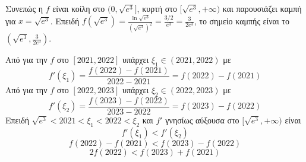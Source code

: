 \begin{alist}
    Συνεπώς η $f$ είναι κοίλη στο $(0, \sqrt{e^3}]$, κυρτή στο $[\sqrt{e^3}, +\infty)$ και παρουσιάζει καμπή για $x = \sqrt{e^3}$. Επειδή $f(\sqrt{e^3}) = \frac{\ln \sqrt{e^3}}{(\sqrt{e^3})^2} = \frac{3/2}{e^3} = \frac{3}{2e^3}$, το σημείο καμπής είναι το $(\sqrt{e^3}, \frac{3}{2e^3})$.

    \item [δ)] Από  για την $f$ στο $[2021,2022]$ υπάρχει $\xi_1 \in (2021,2022)$ με
    \[ f'(\xi_1) = \frac{f(2022)-f(2021)}{2022-2021} = f(2022)-f(2021) \]
    Από  για την $f$ στο $[2022,2023]$ υπάρχει $\xi_2 \in (2022,2023)$ με
    \[ f'(\xi_2) = \frac{f(2023)-f(2022)}{2023-2022} = f(2023)-f(2022) \]
    Επειδή $\sqrt{e^3} < 2021 < \xi_1 < 2022 < \xi_2$ και $f'$ γνησίως αύξουσα στο $[\sqrt{e^3}, +\infty)$ είναι
    \[ f'(\xi_1) < f'(\xi_2) \]
    \[ f(2022)-f(2021) < f(2023)-f(2022) \]
    \[ 2f(2022) < f(2023)+f(2021) \]
\end{alist}
